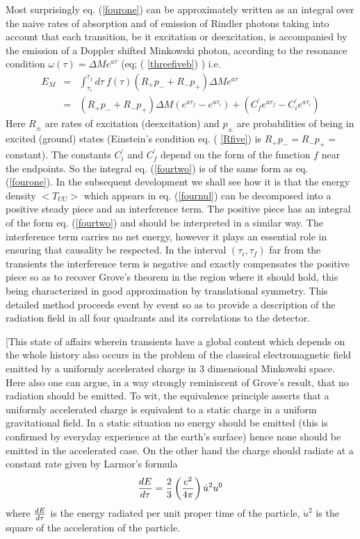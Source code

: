 \documentclass[12pt,oneside]{report}
\def\om{\omega	}
\begin{document}
 Most surprisingly eq. (\ref{fourone}) can be approximately written as an
integral over the naive rates of absorption and of emission of Rindler
photons taking into account that each transition, be it excitation or
deexcitation, is accompanied by the emission of a Doppler shifted Minkowski
photon, according to the resonance condition $\om(\tau) = \Delta M e^{a\tau}$
(eq; ( \ref{threefiveb}) )
i.e.
\begin{eqnarray} E_M &=& \int_{\tau_i}^{\tau_f}\! d\tau \ f(\tau)( R_+ p_- +
R_- p_+ ) \Delta M e^{a\tau }\nonumber\\
&=&( R_+ p_- +
R_- p_+ ) \Delta M ( e^{a\tau_f } - e^{a \tau_i}) +( C^\prime_f e^{a \tau_f} 
-C^\prime_i e^{a \tau_i})
\label{fourtwo}
\end{eqnarray}
Here $R_\pm$ are rates of excitation (deexcitation) and $p_\pm$ are
probabilities of being in excited (ground) states (Einstein's condition
eq. ( \ref{Rfive}) is $R_+ p_- = R_- p_+ =$constant). The constants
$C^\prime_i$ and $C^\prime_f$
 depend on the form of the function $f$ near the endpoints. So the
integral eq. (\ref{fourtwo}) is of the same form as eq. (\ref{fourone}). In the
subsequent development we shall see how it is that the energy density
$<T_{UU}>$ which appears in eq. (\ref{fournul}) can be decomposed into a positive
steady piece and an interference term. The positive piece has an integral of the
form eq. (\ref{fourtwo}) and should be interpreted in a similar way. The
interference term carries no net energy, however it plays an essential role in
ensuring that causality be respected. In the interval $(\tau_i,\tau_f)$ far from
the transients the interference term is negative and exactly compensates the
positive piece  so as
to recover Grove's theorem in the region where it should hold, this being
characterized in good approximation by translational symmetry. This
detailed method proceeds event by event so as to provide a description of
the radiation field in all four quadrants and its correlations to the
detector. 

[This state of affairs wherein transients have a global content which
depends on the whole history also occurs in the problem of the classical
electromagnetic field emitted by a uniformly accelerated charge in 3
dimensional Minkowski space. Here also one can argue, in a way strongly
reminiscent of Grove's result, that no radiation should be emitted. To wit,
the equivalence principle asserts that a uniformly accelerated charge is
equivalent to a static charge in a uniform gravitational field. In a
static situation no energy should be emitted (this is confirmed by everyday
experience at the earth's surface) hence none should be emitted in the
accelerated case. On the  other hand the charge should radiate at a constant
rate given by Larmor's formula \begin{equation} {dE \over d\tau} = {2 \over 3}
\left( e^2 \over 4 \pi \right) \dot u^2 u^0 \label{Bone}
\end{equation}
where ${dE \over d\tau}$ is the energy radiated per unit proper time of the
particle, $\dot u^2$ is the square of the acceleration of the particle. 
\end{document}
